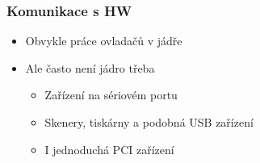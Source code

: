 
\begin{frame}
  \frametitle{Komunikace s HW}

  \begin{itemize}
    \item Obvykle práce ovladačů v jádře

    \pause

    \item Ale často není jádro třeba
    \begin{itemize}
      \item Zařízení na sériovém portu
      \item Skenery, tiskárny a podobná USB zařízení
      \item I jednoduchá PCI zařízení
    \end{itemize}
  \end{itemize}

\end{frame}

